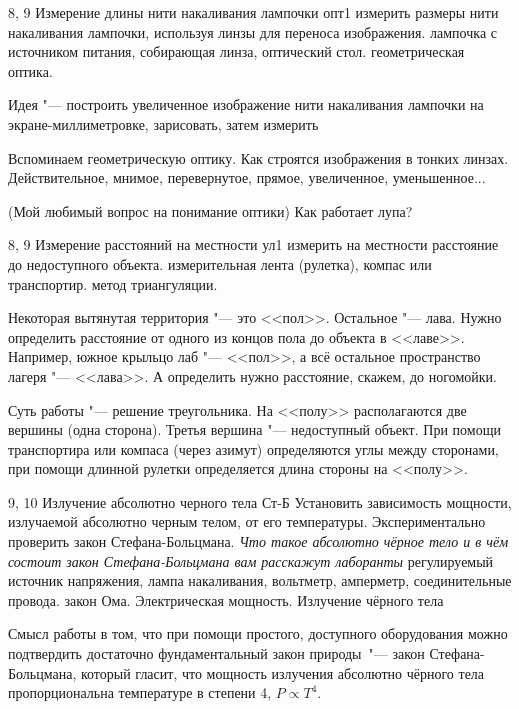 \begin{enumerate}
		{8, 9}
		{Измерение длины нити накаливания лампочки}
		{опт1}
		{измерить размеры нити накаливания лампочки, используя линзы для переноса изображения.}
		{лампочка с источником питания, собирающая линза, оптический стол.}
		{геометрическая оптика.}
		{\item Идея "--- построить увеличенное изображение нити накаливания лампочки на экране-миллиметровке, зарисовать, затем измерить
		\item Вспоминаем геометрическую оптику. Как строятся изображения в тонких линзах. Действительное, мнимое, перевернутое, прямое, увеличенное, уменьшенное...
		\item (Мой любимый вопрос на понимание оптики) Как работает лупа?}
	\item \labtitle
		{8, 9}
		{Измерение расстояний на местности}
		{ул1}
		{измерить на местности расстояние до недоступного объекта.}
		{измерительная лента (рулетка), компас или транспортир.}
		{метод триангуляции.}
		{\item Некоторая вытянутая территория "--- это <<пол>>. Остальное "--- лава. Нужно определить расстояние от одного из концов пола до объекта в <<лаве>>. Например, южное крыльцо лаб "--- <<пол>>, а всё остальное пространство лагеря "--- <<лава>>. А определить нужно расстояние, скажем, до ногомойки.
        \item Суть работы "--- решение треугольника. На <<полу>> располагаются две вершины (одна сторона). Третья вершина "--- недоступный объект. При помощи транспортира или компаса (через азимут) определяются углы между сторонами, при помощи длинной рулетки определяется длина стороны на <<полу>>.}
	\item \labtitle
		{9, 10}
		{Излучение абсолютно черного тела}
		{Ст-Б}
		{Установить зависимость мощности, излучаемой абсолютно черным телом, от его температуры. Экспериментально проверить закон Стефана-Больцмана. \textit{Что такое абсолютно чёрное тело и в чём состоит закон Стефана-Больцмана вам расскажут лаборанты}}
		{регулируемый источник напряжения, лампа накаливания, вольтметр, амперметр, соединительные провода.}
		{закон Ома. Электрическая мощность. Излучение чёрного тела}
		{\item Смысл работы в том, что при помощи простого, доступного оборудования можно подтвердить достаточно фундаментальный закон природы~"--- закон Стефана-Больцмана, который гласит, что мощность излучения абсолютно чёрного тела пропорциональна температуре в степени 4, $P \propto T^4$.

}
\end{enumerate}
